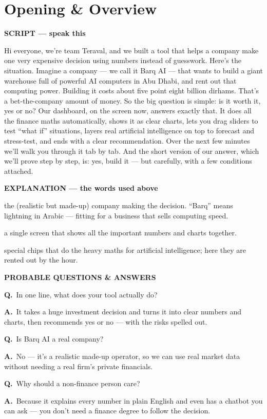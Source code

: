\documentclass[12pt,a4paper]{article}
\newcommand{\block}[2]{\par\medskip\noindent\textcolor{#1}{\textbf{#2}}\par\nobreak\smallskip}
\newcommand{\SC}{\block{tvblue}{SCRIPT --- speak this}}
\newcommand{\EX}{\block{tvgreen}{EXPLANATION --- the words used above}}
\newcommand{\PQ}{\block{tvamber}{PROBABLE QUESTIONS \& ANSWERS}}
\newcommand{\qa}[2]{\par\noindent\textbf{Q.}~#1\par\noindent\textbf{A.}~#2\par\smallskip}
\newenvironment{terms}{\begin{description}[leftmargin=0pt,itemsep=2pt,font=\normalfont\bfseries]}{\end{description}}
\begin{document}
\tableofcontents
\newpage

\section{Opening \& Overview}

\SC
Hi everyone, we're team Teraval, and we built a tool that helps a company make one very expensive
decision using numbers instead of guesswork. Here's the situation. Imagine a company --- we call it
Barq AI --- that wants to build a giant warehouse full of powerful AI computers in Abu Dhabi, and
rent out that computing power. Building it costs about five point eight billion dirhams. That's a
bet-the-company amount of money. So the big question is simple: is it worth it, yes or no? Our
dashboard, on the screen now, answers exactly that. It does all the finance maths automatically, shows
it as clear charts, lets you drag sliders to test ``what if'' situations, layers real artificial
intelligence on top to forecast and stress-test, and ends with a clear recommendation. Over the next
few minutes we'll walk you through it tab by tab. And the short version of our answer, which we'll
prove step by step, is: yes, build it --- but carefully, with a few conditions attached.

\EX
\begin{terms}
  \item[Barq AI:] the (realistic but made-up) company making the decision. ``Barq'' means lightning
  in Arabic --- fitting for a business that sells computing speed.
  \item[Dashboard:] a single screen that shows all the important numbers and charts together.
  \item[AI computers / GPUs:] special chips that do the heavy maths for artificial intelligence; here
  they are rented out by the hour.
\end{terms}

\PQ
\qa{In one line, what does your tool actually do?}{It takes a huge investment decision and turns it
into clear numbers and charts, then recommends yes or no --- with the risks spelled out.}
\qa{Is Barq AI a real company?}{No --- it's a realistic made-up operator, so we can use real market
data without needing a real firm's private financials.}
\qa{Why should a non-finance person care?}{Because it explains every number in plain English and even
has a chatbot you can ask --- you don't need a finance degree to follow the decision.}
\end{document}
